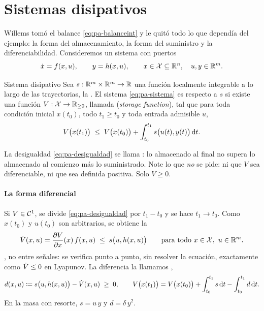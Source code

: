 \section{Sistemas disipativos}
\label{sec:pa-disipatividad}

Willems tomó el balance \eqref{eq:pa-balanceint} y le quitó todo lo que dependía del ejemplo: la forma del almacenamiento, la forma del suministro y la diferenciabilidad. Consideremos un sistema con puertos
\begin{equation}
  \dot x=f(x,u),\qquad y=h(x,u),\qquad x\in\mathcal X\subseteq\mathbb{R}^n,\quad u,y\in\mathbb{R}^m .
  \label{eq:pa-sistema}
\end{equation}

\begin{definicion}[label=def:pa-disipativo]{Sistema disipativo \citep{Wil72a}}
Sea $s:\mathbb{R}^m\times\mathbb{R}^m\to\mathbb{R}$ una función localmente integrable a lo largo de las trayectorias, la . El sistema \eqref{eq:pa-sistema} es  respecto a $s$ si existe una función $V:\mathcal X\to\mathbb{R}_{\ge 0}$, llamada  (\emph{storage function}), tal que para toda condición inicial $x(t_0)$, todo $t_1\ge t_0$ y toda entrada admisible $u$,
\begin{equation}
  V\bigl(x(t_1)\bigr)\;\le\;V\bigl(x(t_0)\bigr)+\int_{t_0}^{t_1}s\bigl(u(t),y(t)\bigr)\,\mathrm{d} t .
  \label{eq:pa-desigualdad}
\end{equation}
\end{definicion}

La desigualdad \eqref{eq:pa-desigualdad} se llama : lo almacenado al final no supera lo almacenado al comienzo más lo suministrado. Note lo que \emph{no} se pide: ni que $V$ sea diferenciable, ni que sea definida positiva. Solo $V\ge0$.

\paragraph{La forma diferencial}
Si $V\in\mathcal{C}^{1}$, se divide \eqref{eq:pa-desigualdad} por $t_1-t_0$ y se hace $t_1\to t_0$. Como $x(t_0)$ y $u(t_0)$ son arbitrarios, se obtiene la 
\begin{equation}
  \dot V(x,u)=\frac{\partial V}{\partial x}(x)\,f(x,u)\;\le\;s\bigl(u,h(x,u)\bigr)\qquad\text{para todo }x\in\mathcal X,\ u\in\mathbb{R}^m .
  \label{eq:pa-diferencial}
\end{equation}
, no entre señales: se verifica punto a punto, sin resolver la ecuación, exactamente como $\dot V\le0$ en Lyapunov. La diferencia la llamamos ,
\begin{equation}
  d(x,u)\coloneqq s\bigl(u,h(x,u)\bigr)-\dot V(x,u)\;\ge\;0,
  \qquad
  V\bigl(x(t_1)\bigr)=V\bigl(x(t_0)\bigr)+\int_{t_0}^{t_1}s\,\mathrm{d} t-\int_{t_0}^{t_1}d\,\mathrm{d} t .
  \label{eq:pa-tasa}
\end{equation}
En la masa con resorte, $s=u\,y$ y $d=\delta\,y^2$.


